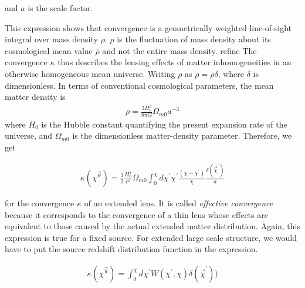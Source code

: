 \documentclass[12pt]{article}
\newcommand{\beqa}{\begin{eqnarray}}
\newcommand{\eeqa}{\end{eqnarray}}
\numberwithin{equation}{section}
\begin{document}
and $a$ is the scale factor.

This expression shows that convergence is a geometrically weighted line-of-sight integral over mass density $\rho$. $\rho$ is the fluctuation of mass density about its cosmological mean value $\bar{\rho}$ and not the entire mass density.{\color{red} refine} The convergence $\kappa$  thus describes the lensing effects of matter inhomogeneities in an otherwise homogeneous mean universe. Writing $\rho$ as $\rho = \bar{\rho} \delta$, where $\delta$ is dimensionless. In terms of conventional cosmological parameters, the mean matter density is 
\beqa
\bar{\rho} = \frac{3 H_0^2}{8 \pi G} \Omega_{m0} a^{-3}
\eeqa
where $H_0$ is the Hubble constant quantifying the present expansion rate of the universe, and $\Omega_{m0}$ is the dimensionless matter-density parameter. Therefore, we get

\beqa
\kappa (\chi^{\vec{\theta}}) = \frac{3}{2} \frac{H_0^2}{c^2} \Omega_{m0} \int_0^\chi d\chi^\prime \chi^\prime \frac{(\chi - \chi^\prime)}{\chi} \frac{\delta(\vec{\chi}^\prime)}{a} \label{eq:eff_convergence}
\eeqa

for the convergence $\kappa$ of an extended lens. It is called \textit{effective convergence} because it corresponds to the convergence of a thin lens whose effects are equivalent to those caused by the actual extended matter distribution. Again, this expression is true for a fixed source. For extended large scale structure, we would have to put the source redshift distribution function in the expression.

\beqa
\kappa (\chi^{\vec{\theta}})= \int_0^{\chi} d\chi^\prime W(\chi^\prime,\chi) \delta (\vec{\chi}^\prime))
\eeqa
\end{document}
